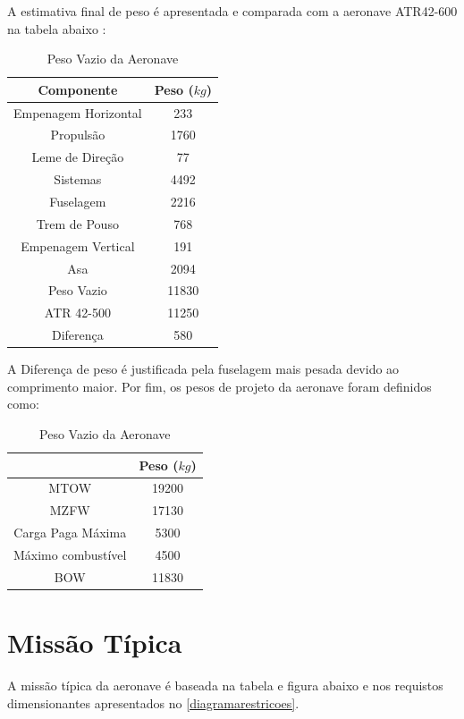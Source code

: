 A estimativa final de peso é apresentada e comparada com a aeronave ATR42-600 na tabela abaixo :

\begin{table}[H]
    \centering
    \begin{tabular}{cc}
    \toprule
    Componente & Peso ($kg$) \\ \midrule
    Empenagem Horizontal & 233 \\
    Propulsão & 1760 \\
    Leme de Direção & 77 \\
    Sistemas & 4492 \\
    Fuselagem & 2216 \\
    Trem de Pouso & 768 \\
    Empenagem Vertical & 191 \\
    Asa & 2094 \\ \midrule
    Peso Vazio & 11830 \\
    ATR 42-500 & 11250 \\ \midrule
    Diferença  & 580 \\
    \bottomrule
    \end{tabular}
    \caption{Peso Vazio da Aeronave}
    \label{tab:results_weight}
\end{table}

A Diferença de peso é justificada pela fuselagem mais pesada devido ao comprimento maior. Por fim, os pesos de projeto da aeronave foram definidos como:

\begin{table}[H]
    \centering
    \begin{tabular}{cc}
    \toprule
       & Peso ($kg$) \\ \midrule
    MTOW & 19200 \\
    MZFW & 17130 \\
    Carga Paga Máxima & 5300 \\
    Máximo combustível & 4500 \\
    BOW & 11830 \\
    \bottomrule
    \end{tabular}
    \caption{Peso Vazio da Aeronave}
    \label{tab:weight}
\end{table}


\section{Missão Típica}

A missão típica da aeronave é baseada na tabela e figura abaixo e nos requistos dimensionantes apresentados no \autoref{diagramarestricoes}.


